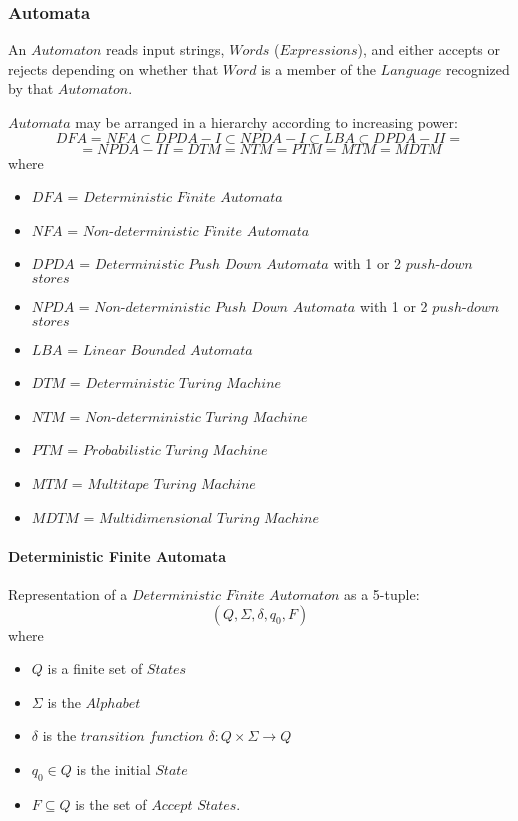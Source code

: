 \documentclass{article}
\begin{document}
\subsubsection{Automata}
    An $Automaton$ reads input strings, $Words$ ($Expressions$), and
    either accepts or rejects depending on whether that $Word$ is a
    member of the $Language$ recognized by that $Automaton$.

    $Automata$ may be arranged in a hierarchy according to increasing power:
    \[
        DFA = NFA \subset DPDA-I \subset NPDA-I \subset LBA \subset DPDA-II =
    \]\[
        = NPDA-II = DTM = NTM = PTM = MTM = MDTM
    \]
    where
    \begin{itemize}
    \item $DFA$ = $Deterministic$ $Finite$ $Automata$
    \item $NFA$ = $Non$-$deterministic$ $Finite$ $Automata$
    \item $DPDA$ = $Deterministic$ $Push$ $Down$ $Automata$ with 1
      or 2 $push$-$down$ $stores$
    \item $NPDA$ = $Non$-$deterministic$ $Push$ $Down$ $Automata$
      with 1 or 2 $push$-$down$ $stores$
    \item $LBA$ = $Linear$ $Bounded$ $Automata$
    \item $DTM$ = $Deterministic$ $Turing$ $Machine$
    \item $NTM$ = $Non$-$deterministic$ $Turing$ $Machine$
    \item $PTM$ = $Probabilistic$ $Turing$ $Machine$
    \item $MTM$ = $Multitape$ $Turing$ $Machine$
    \item $MDTM$ = $Multidimensional$ $Turing$ $Machine$
    \end{itemize}

    \paragraph{Deterministic Finite Automata}
    Representation of a $Deterministic$ $Finite$ $Automaton$ as a 5-tuple:
    \[
        (Q,\Sigma,\delta,q_0,F)
    \]
    where
    \begin{itemize}
    \item $Q$ is a finite set of $States$
    \item $\Sigma$ is the $Alphabet$
    \item $\delta$ is the $transition$ $function$ $\delta: Q \times
      \Sigma \rightarrow Q$
    \item $q_0 \in Q$ is the initial $State$
    \item $F \subseteq Q$ is the set of $Accept$ $States$.
    \end{itemize}
\end{document}
